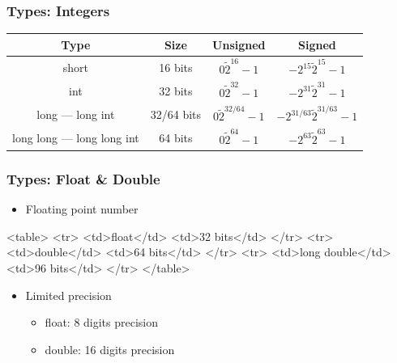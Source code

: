 \documentclass{../c-lecture}
\begin{document}
\begin{frame}
  \frametitle{Types: Integers}
  \begin{table}
  \begin{tabular}{cccc}
    \toprule

    Type &
    Size &
    Unsigned &
    Signed \\

    \midrule

    short &
    16 bits &
    $0 \tilde 2^{16} - 1$ &
    $-2^{15} \tilde 2^{15} - 1$ \\

    \midrule

    int &
    32 bits &
    $0 \tilde 2^{32} - 1$ &
    $-2^{31} \tilde 2^{31} - 1$ \\

    \midrule

    long --- long int &
    32/64 bits &
    $0 \tilde 2^{32/64} - 1$ &
    $-2^{31/63} \tilde 2^{31/63} - 1$ \\

    \midrule

    long long --- long long int &
    64 bits &
    $0 \tilde 2^{64} - 1$ &
    $-2^{63} \tilde 2^{63} - 1$ \\

    \bottomrule
  \end{tabular}
  \end{table}
\end{frame}

\begin{frame}
  \frametitle{Types: Float \& Double}
  \begin{itemize}
    \item Floating point number
  \end{itemize}
  <table>
    <tr>
      <td>float</td>
      <td>32 bits</td>
    </tr>
    <tr>
      <td>double</td>
      <td>64 bits</td>
    </tr>
    <tr>
      <td>long double</td>
      <td>96 bits</td>
    </tr>
  </table>
  \begin{itemize}
    \item Limited precision
    \begin{itemize}
      \item float: 8 digits precision
      \item double: 16 digits precision
    \end{itemize}
  \end{itemize}
\end{frame}
\end{document}
